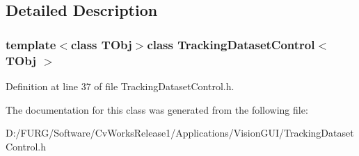 \subsection{Detailed Description}
\subsubsection*{template$<$class T\+Obj$>$class Tracking\+Dataset\+Control$<$ T\+Obj $>$}



Definition at line 37 of file Tracking\+Dataset\+Control.\+h.



The documentation for this class was generated from the following file\+:\begin{DoxyCompactItemize}
\item 
D\+:/\+F\+U\+R\+G/\+Software/\+Cv\+Works\+Release1/\+Applications/\+Vision\+G\+U\+I/Tracking\+Dataset\+Control.\+h\end{DoxyCompactItemize}
